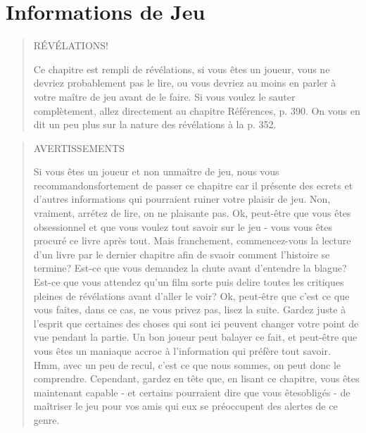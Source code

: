\chapter{Informations de Jeu} \label{cha:game-information} 

\begin{quotation} \begin{LARGE} \begin{center} RÉVÉLATIONS! \end{center} \end{LARGE} Ce chapitre est rempli de révélations, si vous êtes un joueur, vous ne devriez probablement pas le lire, ou vous devriez au  moins en parler à votre maître de jeu avant de le faire. Si vous voulez le sauter complètement, allez directement au chapitre Références, p. 390. On vous en dit un peu plus sur la nature des  révélations à la p. 352. \end{quotation} 

\newpage

\begin{quotation} \begin{LARGE} AVERTISSEMENTS \end{LARGE} 

Si vous êtes un joueur et non unmaître de jeu, nous vous recommandonsfortement de passer ce chapitre car il présente des ecrets et d'autres informations qui pourraient ruiner votre plaisir de jeu. Non, vraiment, arrétez de lire, on ne plaisante pas. Ok, peut-être que vous êtes obsessionnel et que vous voulez tout savoir sur le jeu - vous vous êtes procuré ce livre après tout. Mais franchement, commencez-vous la lecture d'un livre par le dernier chapitre afin de svaoir comment l'histoire se termine? Est-ce que vous demandez la chute avant d'entendre la blague? Est-ce que vous attendez qu'un film sorte puis delire toutes les critiques pleines de révélations avant d'aller le voir? Ok, peut-être que c'est ce que vous faites, dans ce cas, ne vous privez pas, lisez la suite. Gardez juste à l'esprit que certaines des choses qui sont ici peuvent changer votre point de vue pendant la partie. Un bon joueur peut balayer ce fait, et peut-être que vous êtes un maniaque accroc à l'information qui préfère tout savoir. Hmm, avec un peu de recul, c'est ce que nous sommes, on peut donc le comprendre. Cependant, gardez en tête que, en lisant ce chapitre, vous êtes maintenant capable - et certains pourraient dire que vous êtesobligés - de maîtriser le jeu pour vos amis qui eux se préoccupent des alertes de ce genre. \end{quotation} 

